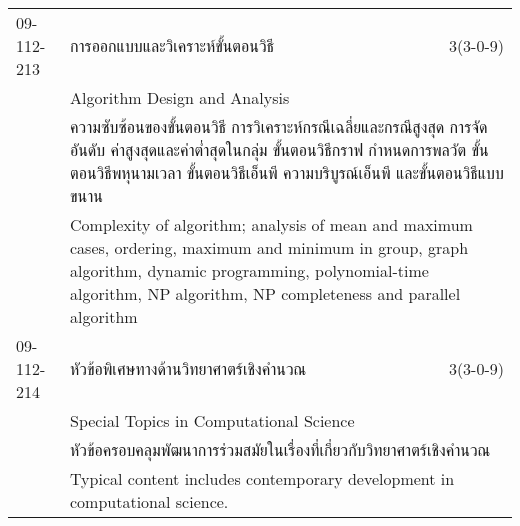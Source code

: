 \begin{longtable}{p{}p{}r{}}
09-112-213 & การออกแบบและวิเคราะห์ขั้นตอนวิธี & 3(3-0-9)\\*
 & Algorithm Design and Analysis & \phantom{x} \vspace{3mm} \\*
&  \multicolumn{2}{p{0.75\textwidth}}{ความซับซ้อนของขั้นตอนวิธี การวิเคราะห์กรณีเฉลี่ยและกรณีสูงสุด การจัดอันดับ ค่าสูงสุดและค่าต่ำสุดในกลุ่ม ขั้นตอนวิธีกราฟ กำหนดการพลวัต ขั้นตอนวิธีพหุนามเวลา ขั้นตอนวิธีเอ็นพี ความบริบูรณ์เอ็นพี และขั้นตอนวิธีแบบขนาน} \vspace{3mm} \\*
&  \multicolumn{2}{p{0.75\textwidth}}{Complexity of algorithm; analysis of mean and maximum cases, ordering, maximum and minimum in group, graph algorithm, dynamic programming, polynomial-time algorithm, NP algorithm, NP completeness and parallel algorithm} \vspace{8mm} \\*
09-112-214 & หัวข้อพิเศษทางด้านวิทยาศาตร์เชิงคำนวณ & 3(3-0-9)\\*
 & Special Topics in Computational Science & \phantom{x} \vspace{3mm} \\*
&  \multicolumn{2}{p{0.75\textwidth}}{หัวข้อครอบคลุมพัฒนาการร่วมสมัยในเรื่องที่เกี่ยวกับวิทยาศาตร์เชิงคำนวณ} \vspace{3mm} \\*
&  \multicolumn{2}{p{0.75\textwidth}}{Typical content includes contemporary development in computational science.} \vspace{8mm} \\*
\end{longtable}
